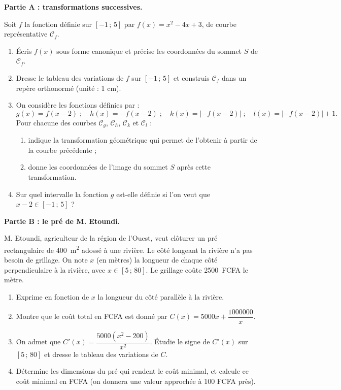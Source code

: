 \documentclass[11pt]{article}
\begin{document}
\begin{exercice}
\textbf{Partie A : transformations successives.}

Soit $f$ la fonction définie sur $[-1\,;\,5]$ par $f(x)=x^{2}-4x+3$, de courbe représentative $\mathcal{C}_{f}$.
\begin{enumerate}
\item Écris $f(x)$ sous forme canonique et précise les coordonnées du sommet $S$ de $\mathcal{C}_{f}$.
\item Dresse le tableau des variations de $f$ sur $[-1\,;\,5]$ et construis $\mathcal{C}_{f}$ dans un repère orthonormé (unité : 1 cm).
\item On considère les fonctions définies par :
\[ g(x)=f(x-2) \;;\quad h(x)=-f(x-2) \;;\quad k(x)=\left|-f(x-2)\right| \;;\quad l(x)=\left|-f(x-2)\right|+1. \]
Pour chacune des courbes $\mathcal{C}_{g}$, $\mathcal{C}_{h}$, $\mathcal{C}_{k}$ et $\mathcal{C}_{l}$ :
\begin{enumerate}
\item indique la transformation géométrique qui permet de l'obtenir à partir de la courbe précédente ;
\item donne les coordonnées de l'image du sommet $S$ après cette transformation.
\end{enumerate}
\item Sur quel intervalle la fonction $g$ est-elle définie si l'on veut que $x-2\in[-1\,;\,5]$ ?
\end{enumerate}

\textbf{Partie B : le pré de M. Etoundi.}

M. Etoundi, agriculteur de la région de l'Ouest, veut clôturer un pré rectangulaire de \SI{400}{m^{2}} adossé à une rivière. Le côté longeant la rivière n'a pas besoin de grillage. On note $x$ (en mètres) la longueur de chaque côté perpendiculaire à la rivière, avec $x\in[5\,;\,80]$. Le grillage coûte \SI{2500}{FCFA} le mètre.
\begin{enumerate}
\item Exprime en fonction de $x$ la longueur du côté parallèle à la rivière.
\item Montre que le coût total en FCFA est donné par $C(x)=5000x+\dfrac{1000000}{x}$.
\item On admet que $C'(x)=\dfrac{5000(x^{2}-200)}{x^{2}}$. Étudie le signe de $C'(x)$ sur $[5\,;\,80]$ et dresse le tableau des variations de $C$.
\item Détermine les dimensions du pré qui rendent le coût minimal, et calcule ce coût minimal en FCFA (on donnera une valeur approchée à 100 FCFA près).
\end{enumerate}
\end{exercice}
\end{document}
